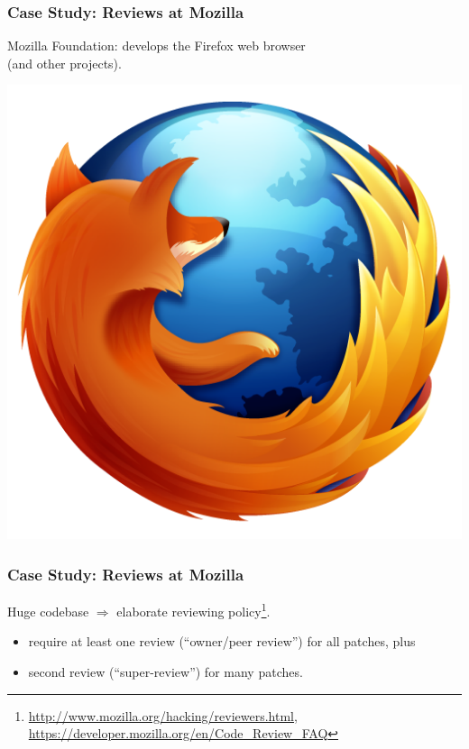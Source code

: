 \begin{frame}
\frametitle{Case Study: Reviews at Mozilla}

\begin{changemargin}{1cm}
Mozilla Foundation: develops the Firefox web browser \\
(and other
projects). 
\end{changemargin}

\begin{center}
\includegraphics[width=.5\textwidth]{images/firefox-512-noshadow.png}
\end{center}
\end{frame}

\begin{frame}
\frametitle{Case Study: Reviews at Mozilla}

\begin{changemargin}{1cm}
Huge codebase $\Rightarrow$ elaborate
reviewing
policy\footnote{\url{http://www.mozilla.org/hacking/reviewers.html}, 
\url{https://developer.mozilla.org/en/Code_Review_FAQ}}.

\begin{itemize}
\item require at least one review (``owner/peer review'') for all
patches, plus
\item second review (``super-review'') for many 
patches.
\end{itemize}
\end{changemargin}
\end{frame}

